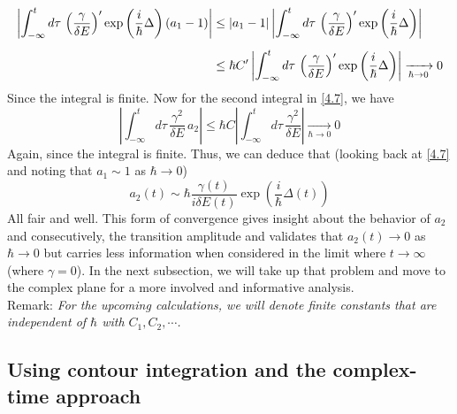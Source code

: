 \documentclass[12pt,a4paper]{article}
\begin{document}
	\begin{align}
		\left| \int_{-\infty}^{t} d\tau \, \left( \dfrac{\gamma}{\delta E} \right)' \exp\left( \dfrac{i}{\hbar} \Delta \right) \left( a_{1} - 1 \right) \right| &\leq \left| a_{1} - 1 \right| \left| \int_{-\infty}^{t} d\tau \, \left( \dfrac{\gamma}{\delta E} \right)' \exp\left( \dfrac{i}{\hbar} \Delta \right) \right| \notag \\[5pt]
		&\leq \hbar C' \left| \int_{-\infty}^{t} d\tau \, \left( \dfrac{\gamma}{\delta E} \right)' \exp\left( \dfrac{i}{\hbar} \Delta \right) \right| \xrightarrow[\hbar \rightarrow 0]{} 0
	\end{align}
	Since the integral is finite. Now for the second integral in \eqref{4.7}, we have
	\begin{equation}
		\left| \int_{-\infty}^{t} d\tau \, \dfrac{\gamma^{2}}{\delta E} \,  a_{2} \right| \leq \hbar C \left| \int_{-\infty}^{t} d\tau \, \dfrac{\gamma^{2}}{\delta E} \right| \xrightarrow[\hbar \rightarrow 0]{} 0
	\end{equation}
	Again, since the integral is finite. Thus, we can deduce that (looking back at \eqref{4.7} and noting that $a_{1} \sim 1$ as $\hbar \rightarrow 0$)
	\begin{equation}
		\boxed{a_{2}(t) \sim \hbar \dfrac{\gamma(t)}{i \delta E(t)} \exp\left( \dfrac{i}{\hbar} \Delta(t) \right)} \label{4.16}
	\end{equation}
	All fair and well. This form of convergence gives insight about the behavior of $a_{2}$ and consecutively, the transition amplitude and validates that $a_{2}(t) \rightarrow 0$ as $\hbar \rightarrow 0$ but carries less information when considered in the limit where $t \rightarrow \infty$ (where $\gamma = 0$). In the next subsection, we will take up that problem and move to the complex plane for a more involved and informative analysis. \\
	
	Remark: \emph{For the upcoming calculations, we will denote finite constants that are independent of $\hbar$ with $C_{1}, C_{2}, \cdots$.}  
	
	\subsection{Using contour integration and the complex-time approach} \label{subsec:complex analysis}
	
\end{document}
